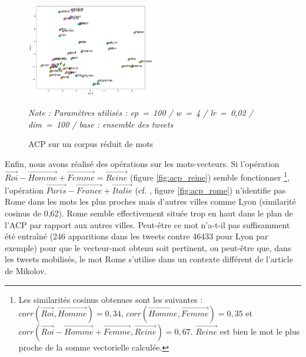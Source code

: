 \documentclass[11pt,french,french]{article}
\let\rmarkdownfootnote\footnote%
\def\footnote{\protect\rmarkdownfootnote}
\begin{document}
\begin{figure}
\begin{center}
\includegraphics[width=0.5\textwidth]{img/acp_gensim.png}
\captionsetup{margin=0cm,format=hang,justification=justified}
\caption{ACP sur un corpus réduit de mots}\label{fig:acp_gensim}
\end{center}
\vspace{-0.3cm}
\footnotesize
\emph{Note : Paramètres utilisés : ep = 100 / w = 4 / lr = 0,02 / dim = 100 / base : ensemble des tweets }
\end{figure}

Enfin, nous avons réalisé des opérations sur les mots-vecteurs. Si
l'opération
\(\overrightarrow{Roi} - \overrightarrow{Homme} + \overrightarrow{Femme} = \overrightarrow{Reine}\)
(figure \ref{fig:acp_reine}) semble fonctionner \footnote{Les
  similarités cosinus obtenues sont les suivantes :
  \(corr(\overrightarrow{Roi}, \overrightarrow{Homme}) = 0,34\),
  \(corr(\overrightarrow{Homme}, \overrightarrow{Femme}) = 0,35\) et
  \(corr(\overrightarrow{Roi} - \overrightarrow{Homme} + \overrightarrow{Femme} , \overrightarrow{Reine}) = 0,67\).
  \(\overrightarrow{Reine}\) est bien le mot le plus proche de la somme
  vectorielle calculée.}, l'opération
\(\overrightarrow{Paris} - \overrightarrow{France} + \overrightarrow{Italie}\)
(cf. \cite{Mikolov}, figure \ref{fig:acp_rome}) n'identifie pas \og Rome
\fg{} dans les mots les plus proches mais d'autres villes comme \og Lyon
\fg{} (similarité cosinus de 0,62). \og Rome \fg{} semble effectivement
située \og trop en haut\fg{} dans le plan de l'ACP par rapport aux
autres villes. Peut-être ce mot n'a-t-il pas suffisamment été entraîné
(246 apparitions dans les tweets contre 46433 pour Lyon par exemple)
pour que le vecteur-mot obtenu soit pertinent, ou peut-être que, dans
les tweets mobilisés, le mot \og Rome \fg{} s'utilise dans un contexte
différent de l'article de Mikolov.
\end{document}
